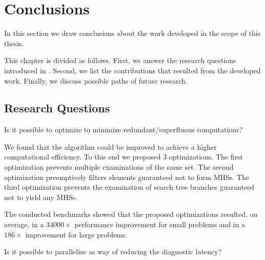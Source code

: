 \renewcommand{\BrainFuckChapter}{
  {+}{+}{+}{+}{[}{+}{+}{+}{+}{>}{-}{-}{-}{<}{]}{>}{.}{+}{[}{-}{-}{-}{>}{+}{<}{]}{>}{+}{+}{+}{.}{-}{.}{-}{-}{-}{-}{-}{-}{-}{-}{-}{-}{-}{.}{+}{+}{+}{+}{+}{+}{+}{+}{+}{.}{+}{+}{+}{+}{+}{+}{+}{+}{+}{.}{-}{-}{.}{-}{-}
  {-}{-}{-}{-}{-}{-}{-}{-}{.}{+}{+}{+}{+}{+}{+}{.}{-}{.}{+}{+}{+}{+}{+}{.}{>}{>}{<}{>}{+}{<}{-}{<}{<}{-}{-}{-}{>}{<}{<}{-}{>}{<}{>}{>}{>}{>}{-}{<}{<}{>}{+}{-}{<}{+}{>}{<}{-}{>}{<}{>}{-}{<}{+}{-}{<}{<}{>}{+}{-}{+}
}
\renewcommand{\LifeChapter}{y}

\chapter{Conclusions}
In this section we draw conclusions about the work developed in the
scope of this thesis.
%

This chapter is divided as follows.
%
First, we answer the research questions introduced in
.
%
Second, we list the contributions that resulted from the developed
work.
%
Finally, we discuss possible paths of future research.


\section{Research Questions}

\begin{description}[leftmargin=!,labelwidth=\widthof{\bfseries \Cref{rq:optimizations} ---}]
\item [\Cref{rq:optimizations} ---] Is it possible to optimize
  \staccato{} to minimize redundant/superfluous computations?
\end{description}

We found that the \staccato{} algorithm could be improved to achieve
a higher computational efficiency.
%
To this end we proposed $3$ optimizations.
%
The first optimization prevents multiple examinations of the same set.
%
The second optimization preemptively filters elements guaranteed not
to form \acp{MHS}.
%
The third optimization prevents the examination of search tree
branches guaranteed not to yield any \acp{MHS}.

The conducted benchmarks showed that the proposed optimizations
resulted, on average, in a $34000\times$ performance improvement for
small problems and in a $186\times$ improvement for large problems.

\begin{description}[leftmargin=!,labelwidth=\widthof{\bfseries \Cref{rq:optimizations} ---}]
\item [\Cref{rq:scalability} ---] Is it possible to parallelize
  \staccato{} as way of reducing the diagnostic latency?
\end{description}

